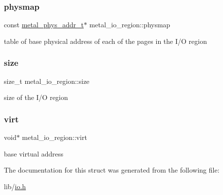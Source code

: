 \subsubsection{\texorpdfstring{physmap}{physmap}}
{\footnotesize\ttfamily const \hyperlink{group__system_gae024fa10b72199a3e26c29b6eb97df5d}{metal\+\_\+phys\+\_\+addr\+\_\+t}$\ast$ metal\+\_\+io\+\_\+region\+::physmap}

table of base physical address of each of the pages in the I/O region \mbox{\label{structmetal__io__region_a131ebc3df546c6e87b1f833882d9fc1e}} 
\subsubsection{\texorpdfstring{size}{size}}
{\footnotesize\ttfamily size\+\_\+t metal\+\_\+io\+\_\+region\+::size}

size of the I/O region \mbox{\label{structmetal__io__region_aaa1ddf24b37d257080e3db253f82d760}} 
\subsubsection{\texorpdfstring{virt}{virt}}
{\footnotesize\ttfamily void$\ast$ metal\+\_\+io\+\_\+region\+::virt}

base virtual address 

The documentation for this struct was generated from the following file\+:\begin{DoxyCompactItemize}
\item 
lib/\hyperlink{io_8h}{io.\+h}\end{DoxyCompactItemize}

